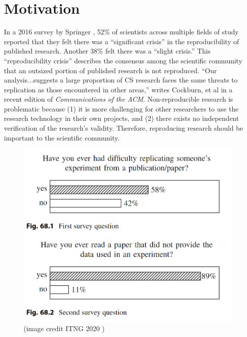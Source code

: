 

\section{Motivation}
\label{sec:introduction}
In a 2016 survey by Springer \cite{baker_1500_2016}, 52\% of scientists across multiple fields of study reported that they felt there was a ``significant crisis'' in the reproducibility of published research. Another 38\% felt there was a ``slight crisis.'' This ``reproducibility crisis'' describes the consensus among the scientific community that an outsized portion of published research is not reproduced. ``Our analysis...suggests
a large proportion of CS research faces
the same threats to replication as those
encountered in other areas,'' writes Cockburn, et al in a recent edition of \textit{Communications of the ACM}. Non-reproducible research is problematic because (1) it is more challenging for other researchers to use the research technology in their own projects, and (2) there exists no independent verification of the research's validity. Therefore, reproducing research should be important to the scientific community. 

\begin{figure}
    \centering
    \includegraphics[width=\linewidth]{images/IT.PNG}
    \caption{ (image credit ITNG 2020 \cite{cacho_state_2020})}
    \label{fig:nature_magazine_reproducibility_figure}
    \vspace{-0.2in}
\end{figure}

